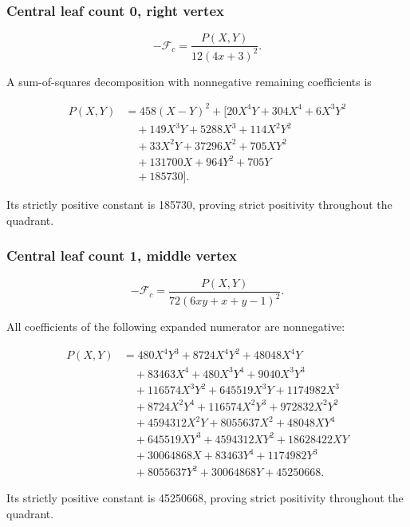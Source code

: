 \documentclass[11pt,reqno]{amsart}
\theoremstyle{plain}
\begin{document}
\par\noindent\begin{minipage}{\linewidth}
\subsubsection*{Central leaf count 0, right vertex}\label{central-leaf-count-0-right-vertex}

\[
-\mathcal F_c=\frac{P(X,Y)}{12 \left(4 x + 3\right)^{2}}.
\]

A sum-of-squares decomposition with nonnegative remaining coefficients is

\[
\begin{aligned}
P(X,Y)&=458 \left(X - Y\right)^{2}+\bigl[20 X^{4} Y + 304 X^{4} + 6 X^{3} Y^{2} \\
&\quad + 149 X^{3} Y + 5288 X^{3} + 114 X^{2} Y^{2} \\
&\quad + 33 X^{2} Y + 37296 X^{2} + 705 X Y^{2} \\
&\quad + 131700 X + 964 Y^{2} + 705 Y \\
&\quad + 185730\bigr].
\end{aligned}
\]

Its strictly positive constant is 185730, proving strict positivity throughout the quadrant.
\end{minipage}\par\medskip

\par\noindent\begin{minipage}{\linewidth}
\subsubsection*{Central leaf count 1, middle vertex}\label{central-leaf-count-1-middle-vertex}

\[
-\mathcal F_c=\frac{P(X,Y)}{72 \left(6 x y + x + y - 1\right)^{2}}.
\]

All coefficients of the following expanded numerator are nonnegative:

\[
\begin{aligned}
P(X,Y)&=480 X^{4} Y^{3} + 8724 X^{4} Y^{2} + 48048 X^{4} Y \\
&\quad + 83463 X^{4} + 480 X^{3} Y^{4} + 9040 X^{3} Y^{3} \\
&\quad + 116574 X^{3} Y^{2} + 645519 X^{3} Y + 1174982 X^{3} \\
&\quad + 8724 X^{2} Y^{4} + 116574 X^{2} Y^{3} + 972832 X^{2} Y^{2} \\
&\quad + 4594312 X^{2} Y + 8055637 X^{2} + 48048 X Y^{4} \\
&\quad + 645519 X Y^{3} + 4594312 X Y^{2} + 18628422 X Y \\
&\quad + 30064868 X + 83463 Y^{4} + 1174982 Y^{3} \\
&\quad + 8055637 Y^{2} + 30064868 Y + 45250668.
\end{aligned}
\]

Its strictly positive constant is 45250668, proving strict positivity throughout the quadrant.
\end{minipage}\par\medskip
\end{document}

